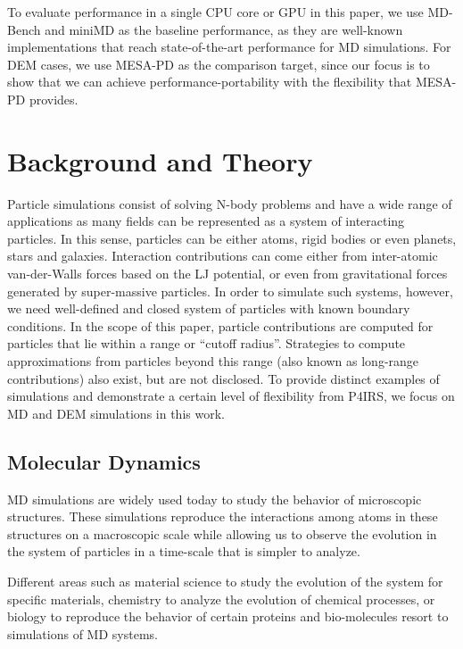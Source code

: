 \documentclass[Afour,sageh,times]{sagej}
\begin{document}
To evaluate performance in a single CPU core or GPU in this paper, we use MD-Bench and miniMD as the baseline performance, as they are well-known implementations that reach state-of-the-art performance for MD simulations.
For DEM cases, we use MESA-PD as the comparison target, since our focus is to show that we can achieve performance-portability with the flexibility that MESA-PD provides. 

\section{Background and Theory}
\label{sec:background}

Particle simulations consist of solving N-body problems and have a wide range of applications as many fields can be represented as a system of interacting particles.
In this sense, particles can be either atoms, rigid bodies or even planets, stars and galaxies.
Interaction contributions can come either from inter-atomic van-der-Walls forces based on the \ac{LJ} potential, or even from gravitational forces generated by super-massive particles.
In order to simulate such systems, however, we need well-defined and closed system of particles with known boundary conditions.
In the scope of this paper, particle contributions are computed for particles that lie within a range or ``cutoff radius''. 
Strategies to compute approximations from particles beyond this range (also known as long-range contributions) also exist, but are not disclosed.
To provide distinct examples of simulations and demonstrate a certain level of flexibility from P4IRS, we focus on MD and DEM simulations in this work.

\subsection{Molecular Dynamics}
\label{sec:md}

\ac{MD} simulations are widely used today to study the behavior of microscopic structures.
These simulations reproduce the interactions among atoms in these structures on a macroscopic scale while allowing us to observe the evolution in the system of particles in a time-scale that is simpler to analyze.

Different areas such as material science to study the evolution of the system for specific materials, chemistry to analyze the evolution of chemical processes, or biology to reproduce the behavior of certain proteins and bio-molecules resort to simulations of \ac{MD} systems.
\end{document}

